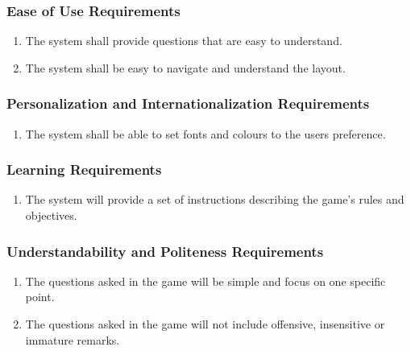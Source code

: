 \documentclass[titlepage]{article}
\begin{document}
		
		\subsubsection{Ease of Use Requirements}
		\label{ssub:ease_of_use_requirements}
		\begin{enumerate}[{UH}1.]
			\item 
			The system shall provide questions that are easy to understand.
			\item
			The system shall be easy to navigate and understand the layout.
		\end{enumerate}
		
		\subsubsection{Personalization and Internationalization Requirements}
		\label{ssub:personalization_and_internationalization_requirements}
		\begin{enumerate}[{UH}1. ]
			\item
			The system shall be able to set fonts and colours to the users preference.
		\end{enumerate}
		
		\subsubsection{Learning Requirements}
		\label{ssub:learning_requirements}
		\begin{enumerate}[{UH}1. ]
			\item
			The system will provide a set of instructions describing the game's rules and objectives.
		\end{enumerate}
		
		\subsubsection{Understandability and Politeness Requirements}
		\label{ssub:understandability_and_politeness_requirements}
		\begin{enumerate}[{UH}1. ]
			\item 
			The questions asked in the game will be simple and focus on one specific point. %
			\item
			The questions asked in the game will not include offensive, insensitive or immature remarks.
		\end{enumerate}
		
\end{document}
